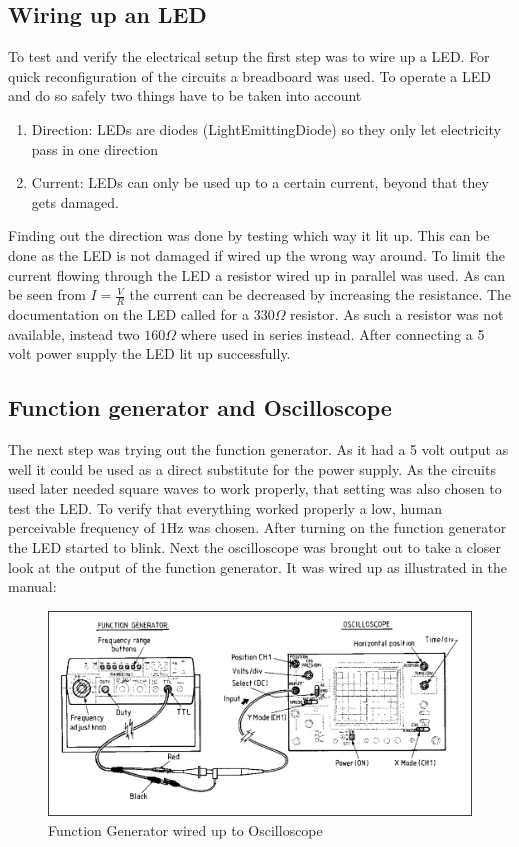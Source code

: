 \documentclass[fleqn,14pt]{article}
\begin{document}
\subsection{Wiring up an LED}
To test and verify the electrical setup the first step was to wire up a LED. For quick reconfiguration of
the circuits a breadboard was used. To operate a LED and do so safely two things have to be taken into account
\begin{enumerate}
\item Direction: LEDs are diodes (LightEmittingDiode) so they only let electricity pass in one direction
\item Current: LEDs can only be used up to a certain current, beyond that they gets damaged.
\end{enumerate}
Finding out the direction was done by testing which way it lit up. This can be done as the LED is not
damaged
if wired up the wrong way around. To limit the current flowing through the LED a resistor wired up in
parallel was used. As can be seen from $I = \frac{V}{R}$ the current can be decreased by increasing the
resistance. The documentation on the LED called for a $330\Omega$ resistor. As such a resistor was not
available, instead two $160\Omega$ where used in series instead. After connecting a 5 volt power supply
the LED lit up successfully.

\subsection {Function generator and Oscilloscope}
The next step was trying out the function generator. As it had a 5 volt output as well it could be used as
a direct substitute for the power supply. As the circuits used later needed square waves to work properly,
that setting was also chosen to test the LED. To verify that everything worked properly a low, human
perceivable frequency of 1Hz was chosen. After turning on the function generator the LED started
to blink.
\newline
\newline
Next the oscilloscope was brought out to take a closer look at the output of the function generator. It
was wired up as illustrated in the manual:
\begin{figure}[h]
\includegraphics[width=16cm]{images/Oscilloscope.png}
\caption{Function Generator wired up to Oscilloscope \cite{ross}}
\label{fig:figure1}
\end{figure}
\end{document}
